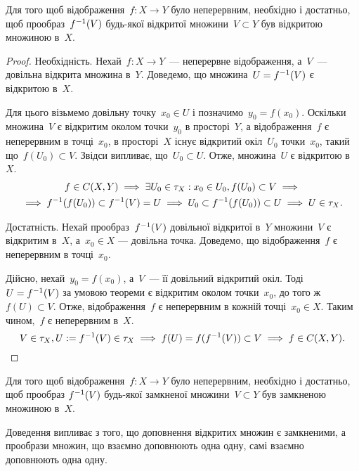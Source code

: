 \begin{theorem}
Для того щоб відображення~$f: X \to Y$
було неперервним, необхідно і достатньо, щоб прообраз~$f^{-1}(V)$
будь-якої відкритої множини~$V \subset Y$ був відкритою
множиною в~$X$.
\end{theorem}

\begin{proof}
Необхідність. Нехай~$f: X \to Y$~--- неперервне відображення, а~$V$~--- довільна
відкрита множина в~$Y$. Доведемо, що множина~$U = f^{-1}(V)$ є відкритою в~$X$.

Для цього візьмемо довільну точку~$x_0 \in U$ і позначимо~$y_0 = f(x_0)$. Оскільки
множина~$V$ є відкритим околом точки~$y_0$ в просторі~$Y$, а відображення~$f$ є
неперервним в точці~$x_0$, в просторі~$X$ існує відкритий окіл~$U_0$ точки~$x_0$,
такий що~$f(U_0) \subset V$. Звідси випливає, що~$U_0 \subset U$. Отже,
множина~$U$ є відкритою в~$X$.
\begin{multline*}
f \in C(X, Y) \implies \exists U_0 \in \tau_X: x_0 \in U_0, f(U_0) \subset V \implies \\
\implies f^{-1}(f(U_0)) \subset f^{-1}(V) = U \implies U_0 \subset f^{-1}(f(U_0)) \subset U \implies U \in \tau_X.
\end{multline*}

Достатність. Нехай прообраз~$f^{-1}(V)$ довільної
відкритої в~$Y$ множини~$V$ є відкритим в~$X$, а~$x_0 \in X$ ---
довільна точка. Доведемо, що відображення~$f$ є неперервним
в точці~$x_0$.

Дійсно, нехай~$y_0 = f(x_0)$, а~$V$~--- її довільний
відкритий окіл. Тоді~$U = f^{-1}(V)$ за умовою теореми є
відкритим околом точки~$x_0$, до того ж~$f(U) \subset V$.
Отже, відображення~$f$ є неперервним в
кожній точці~$x_0 \in X$. Таким чином,~$f$ є неперервним в~$X$.
\begin{equation*}
V \in \tau_X, U := f^{-1}(V) \in \tau_X \implies
f(U) = f(f^{-1}(V)) \subset V \implies f \in C(X, Y). \qedhere
\end{equation*}
\end{proof}

\begin{theorem}
Для того щоб відображення~$f: X \to Y$
було неперервним, необхідно і достатньо, щоб прообраз
$f^{-1}(V)$
будь-якої замкненої множини~$V \subset Y$ був замкненою
множиною в~$X$.
\end{theorem}

Доведення випливає з того, що доповнення відкритих
множин є замкненими, а прообрази множин, що взаємно
доповнюють одна одну, самі взаємно доповнюють одна
одну.

